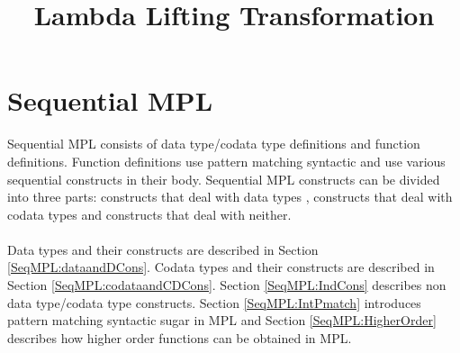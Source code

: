 \documentclass[11pt]{article}
\title{Lambda Lifting Transformation}
\begin{document}
\maketitle
\section {Sequential MPL} 
Sequential MPL consists of data type/codata type definitions and function definitions. Function definitions use pattern matching syntactic and use various sequential constructs in their body. Sequential MPL constructs can be divided into three parts: constructs that deal with data types , constructs that deal with codata types and constructs that deal with neither. 
~~\\~~\\ 
Data types and their constructs are described in Section \ref {SeqMPL:dataandDCons}. Codata types and their constructs are described in Section \ref {SeqMPL:codataandCDCons}. Section \ref {SeqMPL:IndCons} describes non data type/codata type constructs. Section \ref {SeqMPL:IntPmatch} introduces pattern matching syntactic sugar in MPL and Section \ref {SeqMPL:HigherOrder} describes how higher order functions can be obtained in MPL.
\end{document}
